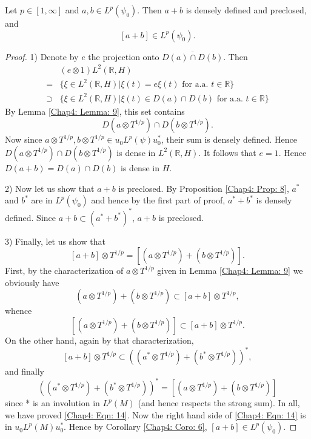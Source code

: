 \begin{lemma}\label{Chap4: Lemma: 10}
    Let $p\in [1,\infty]$ and $a,b\in L^p(\psi_0)$.
    Then $a+b$ is densely defined and preclosed, and
    \[
        [a+b]\in L^p(\psi_0).
    \]
\end{lemma}
\begin{proof}
    1) Denote by $e$ the projection onto $\overline{D(a)\cap D(b)}$. Then
    \[
        \begin{split}
            &(e\otimes 1)L^2(\mathbb{R},H)\\
            =&\{\xi\in L^2(\mathbb{R},H)|\xi(t)=e\xi(t) \text{ for a.a. } t\in \mathbb{R}\}\\
            \supset &\{\xi\in L^2(\mathbb{R},H)|\xi(t)\in D(a)\cap D(b)\text{ for a.a. } t\in \mathbb{R}\}
        \end{split}
    \]
    By Lemma \ref{Chap4: Lemma: 9}, this set contains
    \[
        D(a\otimes T^{1/p})\cap D(b\otimes T^{1/p}).
    \]
    Now since $a\otimes T^{1/p},b\otimes T^{1/p}\in u_0L^p(\psi)u_0^*$, their sum is densely defined. Hence $D(a\otimes T^{1/p})\cap D(b\otimes T^{1/p})$ is dense in $L^2(\mathbb{R},H)$. It follows that $e = 1$. Hence $D(a+b) = D(a)\cap D(b)$ is dense in $H$.\par
    2) Now let us show that $a+b$ is preclosed. By Proposition \ref{Chap4: Prop: 8}, $a^*$ and $b^*$ are in $L^p(\psi_0)$ and hence by the first part of proof, $a^*+ b^*$ is densely defined. Since $a+b \subset (a^*+b^*)^*$, $a+b$ is preclosed.\par
    3) Finally, let us show that
    \begin{equation}\label{Chap4: Eqn: 14}
        [a+b]\otimes T^{1/p}=[(a\otimes T^{1/p})+(b\otimes T^{1/p})].
    \end{equation}
    First, by the characterization of $a\otimes T^{1/p}$ given in Lemma \ref{Chap4: Lemma: 9} we obviously have
    \[
        (a\otimes T^{1/p})+(b\otimes T^{1/p})\subset [a+b]\otimes T^{1/p},
    \]
    whence
    \[
        [(a\otimes T^{1/p})+(b\otimes T^{1/p})]\subset [a+b]\otimes T^{1/p}.
    \]
    On the other hand, again by that characterization,
    \[
        [a+b]\otimes T^{1/p}\subset ((a^*\otimes T^{1/p})+(b^*\otimes T^{1/p}))^*,
    \]
    and finally
    \[
        ((a^*\otimes T^{1/p})+(b^*\otimes T^{1/p}))^*=[(a\otimes T^{1/p})+(b\otimes T^{1/p})]
    \]
    since * is an involution in $L^p(M)$ (and hence respects the strong sum). In all, we have proved \eqref{Chap4: Eqn: 14}. Now the right hand side of \eqref{Chap4: Eqn: 14} is in $u_0L^p(M)u_0^*$. Hence by Corollary \ref{Chap4: Coro: 6}, $[a+b]\in L^p(\psi_0)$.
\end{proof}
